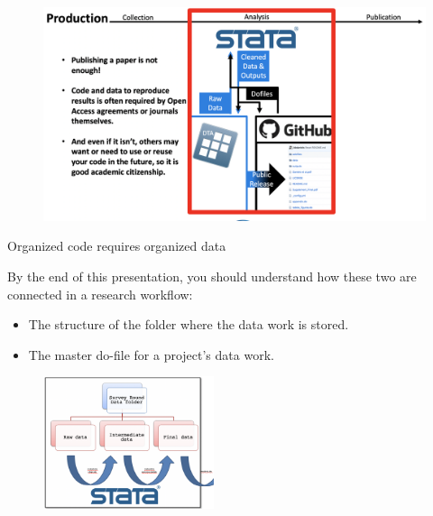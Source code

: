 \documentclass[aspectratio=169]{beamer}
\begin{document}
\begin{frame}

	\begin{figure}
		\centering
		\includegraphics[width=\linewidth]{img/Production2}
	\end{figure}

\end{frame}


\begin{frame}[fragile]{Organized code requires organized data}
\begin{multicols}{2}	
	
	By the end of this presentation, you should understand how these two are connected in a research workflow:
	
	\begin{itemize}[<default overlay specification>]
		\item<1>The structure of the folder where the data work is stored.
		\item<1> The master do-file for a project’s data work.
	\end{itemize}
	
	\begin{figure}
		\centering
		\includegraphics[width=50mm]{img/Organize}
	\end{figure}
	
\end{multicols}
\end{frame}
\end{document}
